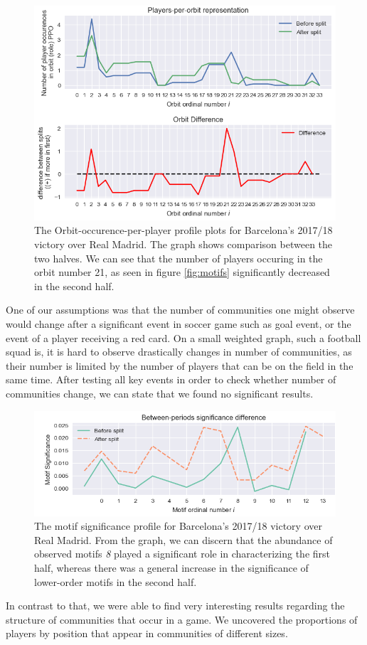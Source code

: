 \documentclass[9pt,twocolumn,twoside]{pnas-report}
\begin{document}
\begin{figure}[t]\centering
	\includegraphics[width=\linewidth]{barcaopp.png}
	\caption{The Orbit-occurence-per-player profile plots for Barcelona's 2017/18 victory over Real Madrid. The graph shows comparison between the two halves. We can see that the number of players occuring in the orbit number 21, as seen in figure \ref{fig:motifs} significantly decreased in the second half.}
	\label{fig:BarcaOPP}
\end{figure}
One of our assumptions was that the number of communities one might observe would change after a significant event in soccer game such as goal event, or the event of a player receiving a red card. On a small weighted graph, such a football squad is, it is hard to observe drastically changes in number of communities, as their number is limited by the number of players that can be on the field in the same time. After testing all key events in order to check whether number of communities change, we can state that we found no significant results.

\begin{figure}[t]\centering
	\includegraphics[width=\linewidth]{barcasignif.png}
	\caption{The motif significance profile for Barcelona's 2017/18 victory over Real Madrid. From the graph, we can discern that the abundance of observed motifs \textit{8} played a significant role in characterizing the first half, whereas there was a general increase in the significance of lower-order motifs in the second half.}
	\label{fig:Barca Significance}
\end{figure}
In contrast to that, we were able to find very interesting results regarding the structure of communities that occur in a game. We uncovered the proportions of players by position that appear in communities of different sizes.
\end{document}
